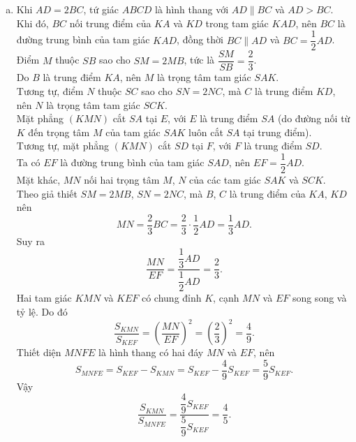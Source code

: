 \begin{ex}
{\begin{enumerate}[a)]
			Mặt phẳng này cũng đi qua  hai điểm $M\in SB$, $N\in SC$.\\
			Như vậy, mặt phẳng $(KMN)$ cắt hình chóp $S.ABCD$ theo thiết diện là tứ giác $MNFE$, với các đỉnh lần lượt nằm trên các cạnh $SB$, $SC$, $SD$, $SA$ của hình  chóp.
			 \item Khi $AD=2BC$, tứ giác $ABCD$ là hình thang với $AD\parallel BC$ và $AD> BC$.\\
			 Khi đó, $BC$ nối trung điểm của $KA$ và $KD$ trong tam giác $KAD$, nên $BC$ là đường trung bình của tam giác $KAD$, đồng thời $BC\parallel AD$ và $BC=\dfrac{1}{2}AD$.\\
			Điểm $M$  thuộc $SB$ sao cho $SM=2MB$, tức là $\dfrac{SM}{SB}=\dfrac{2}{3}$.\\
			Do $B$ là trung điểm $KA$,  nên $M$ là trọng tâm tam giác $SAK$.\\
			Tương tự, điểm $N$ thuộc $SC$ sao cho $SN=2NC$, mà $C$ là trung điểm $KD$, nên $N$ là trọng tâm tam  giác $SCK$.\\
			Mặt phẳng $(KMN)$ cắt $SA$  tại $E$, với $E$ là trung điểm $SA$ (do đường nối từ $K$ đến trọng tâm $M$ của tam giác $SAK$ luôn cắt $SA$ tại trung điểm).\\
			Tương  tự, mặt phẳng $(KMN)$ cắt $SD$ tại $F$, với $F$ là trung điểm $SD$.\\
			Ta có $EF$ là đường trung bình của tam giác  $SAD$, nên $EF=\dfrac{1}{2}AD$.\\
			Mặt khác, $MN$ nối hai trọng tâm $M$, $N$ của các tam giác $SAK$  và $SCK$.\\
			Theo giả thiết $SM=2MB$, $SN=2NC$, mà $B$, $C$ là trung  điểm của $KA$, $KD$ nên
			\[MN=\dfrac{2}{3}BC=\dfrac{2}{3}\cdot\dfrac{1}{2}AD=\dfrac{1}{3}AD.\] 
			Suy  ra \[\dfrac{MN}{EF}=\dfrac{\dfrac{1}{3} AD}{\dfrac{1}{2} AD}=\dfrac{2}{3}.\]
			Hai tam giác $KMN$ và $KEF$ có chung đỉnh $K$, cạnh $MN$ và $EF$ song song và  tỷ lệ. Do đó \[\dfrac{S_{KMN}}{S_{KEF}}=\left(\dfrac{MN}{EF} \right)^2=\left(\dfrac{2}{3} \right)^2=\dfrac{4}{9}.\]
			Thiết diện  $MNFE$ là hình thang có hai đáy $MN$ và $EF$, nên
			 \[S_{MNFE}=S_{KEF}-S_{KMN}=S_{KEF}-\dfrac{4}{9}S_{KEF}=\dfrac{5}{9}S_{KEF}.\]
			 Vậy
			 \[\dfrac{S_{KMN}}{S_{MNFE}}=\dfrac{\dfrac{4}{9}S_{KEF}}{\dfrac{5}{9}S_{KEF}}=\dfrac{4}{5}.\]
		\end{enumerate}
	} 
\end{ex}
